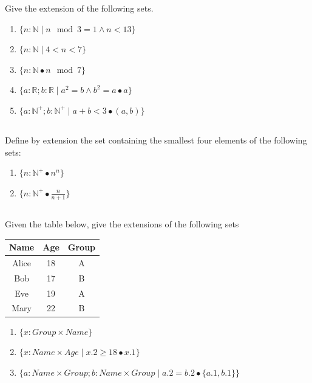 \documentclass[twocolumn]{article}
\begin{document}
    Give the extension of the following sets.

    \begin{enumerate}
        \item $\{ n : \mathbb{N} \mid n \mod 3 = 1 \wedge n < 13 \} $
        \item $\{ n : \mathbb{N} \mid 4 < n < 7 \} $
        \item $ \{ n : \mathbb{N} \bullet n \mod 7 \} $
        \item $\{ a : \mathbb{R}; b : \mathbb{R}  \mid a^2 = b \wedge b^2 = a \bullet a \} $
        \item $\{ a : \mathbb{N}^+; b : \mathbb{N}^+  \mid a + b < 3 \bullet (a, b) \} $
    \end{enumerate}


\subsection{}

    Define by extension the set containing the smallest four elements of the following sets:

    \begin{enumerate}
        \item $ \{ n : \mathbb{N}^+ \bullet n^n \} $
        \item $ \{ n : \mathbb{N}^+ \bullet \frac{n}{n+1} \} $
    \end{enumerate}

\subsection{}

    Given the table below, give the extensions of the following sets

    \begin{table}[h!]
        \centering
        \begin{tabular}{c | c | c }
            \toprule
            Name & Age & Group \\
            \midrule
            Alice & 18 & A  \\
            Bob & 17 & B  \\
            Eve & 19 & A \\
            Mary & 22 & B \\
            \bottomrule
        \end{tabular}
    \end{table}

    \begin{enumerate}
        \item $ \{ x : Group \times Name \} $
        \item $ \{ x : Name \times Age \mid x.2 \ge 18 \bullet x.1 \} $
        \item $ \{ a : Name \times Group; b : Name \times Group \mid a.2 = b.2 \bullet \{a.1, b.1\} \} $
    \end{enumerate} 
\end{document}
